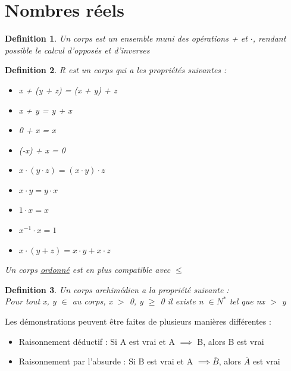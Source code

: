 \documentclass{article}
\newtheorem{definition}{Definition}[section]
\begin{document}
\section{Nombres réels}
\begin{definition}
Un corps est un ensemble muni des opérations + et $ \cdot $, rendant possible le calcul d'opposés et d'inverses
\end{definition}
\begin{definition}
    R est un corps qui a les propriétés suivantes :
    \begin{multicols}{2}
        
    
    \begin{itemize}
        \item x + (y + z) = (x + y) + z
        \item x + y = y + x
        \item 0 + x = x
        \item (-x) + x = 0 
        \columnbreak
        \item \( x \cdot (y \cdot z) =  (x \cdot y) \cdot z\)
        \item \( x \cdot y = y \cdot x\) 
        \item  \(1 \cdot x = x \)
        \item \( x^{-1} \cdot x = 1\)
        \item \(x \cdot (y + z) = x \cdot y + x \cdot z\)
    \end{itemize}
    \end{multicols}
    Un corps \underline{ordonné} est en plus compatible avec \( \leq \) 
\end{definition}
\begin{definition}
    Un corps archimédien a la propriété suivante :\\
    Pour tout x, y \(\in\) au corps, x \(>\) 0, y \(\geq\) 0 il existe n \(\in N^*\) tel que nx \(>\) y
\end{definition}
Les démonstrations peuvent être faites de plusieurs manières différentes :
\begin{itemize}
    \item Raisonnement déductif : Si A est vrai et A \(\implies\) B, alors B est vrai
    \item Raisonnement par l'absurde : Si B est vrai et A \(\implies \overline{B}\), alors \(\overline{A}\) est vrai
\end{itemize}
\end{document}
